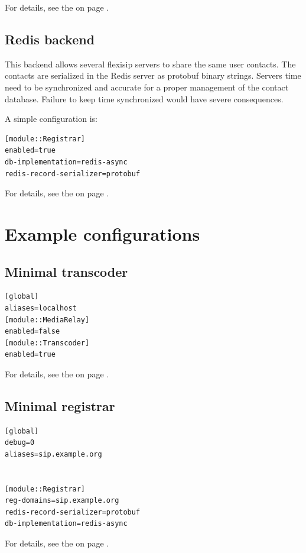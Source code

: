 \documentclass[a4paper,10pt]{article}
\begin{document}
For details, see the  on page \pageref{module::Authentication}.


\subsection{Redis backend}
This backend allows several flexisip servers to share the same user contacts.
The contacts are serialized in the Redis server as protobuf binary strings.
Servers time need to be synchronized and accurate for a proper management of the contact database.
Failure to keep time synchronized would have severe consequences.

A simple configuration is:

\begin{verbatim}
[module::Registrar]
enabled=true
db-implementation=redis-async
redis-record-serializer=protobuf
\end{verbatim}

For details, see the  on page \pageref{module::Registrar}.


\section{Example configurations}
\subsection{Minimal transcoder}
\begin{verbatim}
[global]
aliases=localhost
[module::MediaRelay]
enabled=false
[module::Transcoder]
enabled=true

\end{verbatim}

For details, see the  on page \pageref{module::Transcoder}.


\subsection{Minimal registrar}
\begin{verbatim}
[global]
debug=0
aliases=sip.example.org


[module::Registrar]
reg-domains=sip.example.org
redis-record-serializer=protobuf
db-implementation=redis-async

\end{verbatim}

For details, see the  on page \pageref{module::Registrar}.
\end{document}
